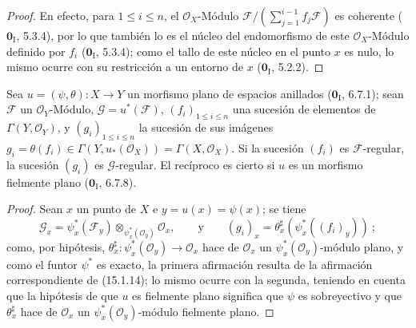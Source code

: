 \begin{proof}
En efecto, para $1\leq i\leq n$, el $\mathcal{O}_X$-Módulo
$\mathscr{F}/(\sum_{j=1}^{i-1}f_j\mathscr{F})$ es coherente
($\mathbf{0}_{\mathrm I}$, 5.3.4), por lo que también lo es el núcleo del endomorfismo
de este $\mathcal{O}_X$-Módulo definido por $f_i$
($\mathbf{0}_{\mathrm I}$, 5.3.4); como el tallo de este núcleo en el punto $x$ es
nulo, lo mismo ocurre con su restricción a un entorno de $x$
($\mathbf{0}_{\mathrm I}$, 5.2.2).
\end{proof}

\begin{proposition}[15.2.5]
\label{0.15.2.5-es}
Sea $u=(\psi,\theta):X\to Y$ un morfismo plano de espacios anillados
\textup{($\mathbf 0_{\mathrm I}$, 6.7.1)}; sean $\mathscr{F}$ un
$\mathcal{O}_Y$-Módulo, $\mathscr{G}=u^*(\mathscr{F})$,
$(f_i)_{1\leq i\leq n}$ una sucesión de elementos de
$\Gamma(Y,\mathcal{O}_Y)$, y $(g_i)_{1\leq i\leq n}$ la sucesión de sus
imágenes
$g_i=\theta(f_i)\in\Gamma(Y,u_*(\mathcal{O}_X))=\Gamma(X,\mathcal{O}_X)$. Si
la sucesión $(f_i)$ es $\mathscr{F}$-regular, la sucesión $(g_i)$ es
$\mathscr{G}$-regular. El recíproco es cierto si $u$ es un morfismo fielmente
plano \textup{($\mathbf 0_{\mathrm I}$, 6.7.8)}.
\end{proposition}

\begin{proof}
Sean $x$ un punto de $X$ e $y=u(x)=\psi(x)$; se tiene
\[
  \mathscr{G}_x=\psi_x^*(\mathscr{F}_y)
  \otimes_{\psi_x^*(\mathcal{O}_y)}\mathcal{O}_x,
  \qquad\text{y}\qquad
  (g_i)_x=\theta_x^\sharp(\psi_x^*((f_i)_y))~;
\]
como, por hipótesis,
$\theta_x^\sharp:\psi_x^*(\mathcal{O}_y)\to\mathcal{O}_x$ hace de
$\mathcal{O}_x$ un $\psi_x^*(\mathcal{O}_y)$-módulo plano, y como el funtor
$\psi^*$ es exacto, la primera afirmación resulta de la afirmación
correspondiente de (15.1.14); lo mismo ocurre con la segunda, teniendo en cuenta
que la hipótesis de que $u$ es fielmente plano significa que $\psi$ es
sobreyectivo y que $\theta_x^\sharp$ hace de $\mathcal{O}_x$ un
$\psi_x^*(\mathcal{O}_y)$-módulo fielmente plano.
\end{proof}
